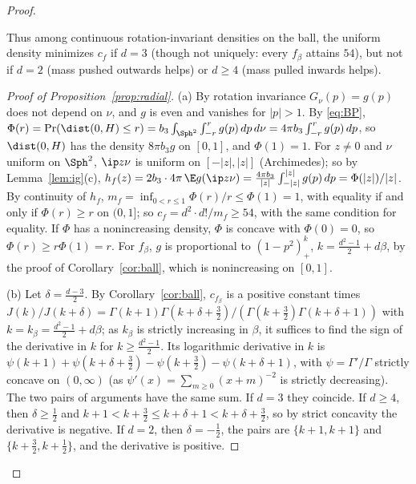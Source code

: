 \begin{proof}
\begin{proposition}
\noindent Thus among continuous rotation-invariant densities on the ball, the uniform density minimizes $c_f$ if $d=3$
(though not uniquely: every $f_\beta$ attains $54$), but not if
$d=2$ (mass pushed outwards helps) or $d\ge4$ (mass pulled inwards helps).
\end{proposition}

\begin{proof}[Proof of Proposition~\ref{prop:radial}]
(a) By rotation invariance $G_\nu(p)=g(p)$ does not depend on $\nu$, and $g$ is even and vanishes for $|p|>1$. By \eqref{eq:BP},
$\Phi(r)=\Pr(\dist(0,H)\le r)=b_3\int_{\Sph^2}\int_{-r}^rg(p)\,dp\,d\nu=4\pi b_3\int_{-r}^rg(p)\,dp$, so $\dist(0,H)$ has the density
$8\pi b_3g$ on $[0,1]$, and $\Phi(1)=1$. For $z\ne0$ and $\nu$ uniform on $\Sph^2$, $\ip z\nu$ is uniform on $[-|z|,|z|]$ (Archimedes);
so by Lemma~\ref{lem:ig}(c), $h_f(z)=2b_3\cdot4\pi\,\E g(\ip z\nu)=\frac{4\pi b_3}{|z|}\int_{-|z|}^{|z|}g(p)\,dp=\Phi(|z|)/|z|$. By continuity
of $h_f$, $m_f=\inf_{0<r\le1}\Phi(r)/r\le \Phi(1)=1$, with equality if and only if $\Phi(r)\ge r$ on $(0,1]$; so $c_f=d^2\cdot d!/m_f\ge54$,
with the same condition for equality. If $\Phi$ has a nonincreasing density, $\Phi$ is concave with $\Phi(0)=0$, so $\Phi(r)\ge r\Phi(1)=r$. For $f_\beta$,
$g$ is proportional to $(1-p^2)_+^{k}$, $k=\frac{d^2-1}2+d\beta$, by the proof of Corollary~\ref{cor:ball}, which is nonincreasing on $[0,1]$.

(b) Let $\delta=\frac{d-3}2$. By Corollary~\ref{cor:ball}, $c_{f_\beta}$ is a positive constant times
$J(k)/J(k+\delta)=\Gamma(k+1)\Gamma(k+\delta+\frac32)/(\Gamma(k+\frac32)\Gamma(k+\delta+1))$ with $k=k_\beta=\frac{d^2-1}2+d\beta$; as $k_\beta$ is strictly increasing in $\beta$, it suffices to find the sign of the
derivative in $k$ for $k\ge\frac{d^2-1}2$. Its logarithmic derivative in $k$ is $\psi(k+1)+\psi(k+\delta+\frac32)-\psi(k+\frac32)-\psi(k+\delta+1)$, with
$\psi=\Gamma'/\Gamma$ strictly concave on $(0,\infty)$ (as $\psi'(x)=\sum_{m\ge0}(x+m)^{-2}$ is strictly decreasing). The two pairs
of arguments have the same sum. If $d=3$ they coincide. If $d\ge4$, then $\delta\ge\frac12$ and
$k+1<k+\frac32\le k+\delta+1<k+\delta+\frac32$, so by strict concavity the derivative is negative. If $d=2$, then $\delta=-\frac12$, the
pairs are $\{k+1,k+1\}$ and $\{k+\frac32,k+\frac12\}$, and the derivative is positive.


\end{proof}
\end{proof}
